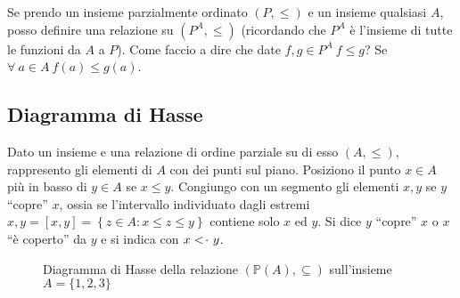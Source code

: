 \begin{defn}\label{ordine_funzioni}
Se prendo un insieme parzialmente ordinato $(P, \le)$ e un insieme qualsiasi $A$, posso definire una relazione su $(P^A, \le)$ (ricordando che $P^A$ \`e l'insieme di tutte le funzioni da $A$ a $P$). Come faccio a dire che date $f, g \in P^A \ f \le g$? Se $\forall \ a \in A \ f(a) \le g(a)$.
\end{defn}

\subsection{Diagramma di Hasse}

Dato un insieme e una relazione di ordine parziale su di esso $(A, \leq)$, rappresento gli elementi di $A$ con dei punti sul piano. Posiziono il punto $x \in A$ pi\`u in basso di $y \in A$ se $x \leq y$. Congiungo con un segmento gli elementi $x, y$ se $y$ ``copre'' $x$, ossia se l'intervallo individuato dagli estremi $x, y = [x, y] = \left \{ z \in A : x \leq z \leq y \right \}$ contiene solo $x$ ed $y$. Si dice $y$ ``copre'' $x$ o $x$ ``\`e coperto'' da $y$ e si indica con $x <\!\cdot \ y$.

\begin{figure}[ht]
\centering
{}
\caption{Diagramma di Hasse della relazione $(\mathbb{P}(A), \subseteq)$ sull'insieme $A = \{1, 2, 3\}$}
\end{figure}

